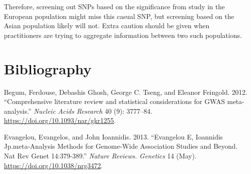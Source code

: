\documentclass[
]{article}
\begin{document}
Therefore, screening out SNPs based on the significance from study in
the European population might miss this casual SNP, but screening based
on the Asian population likely will not. Extra caution should be given
when practitioners are trying to aggregate information between two such
populations.

\hypertarget{bibliography}{%
\section{Bibliography}\label{bibliography}}

\setlength{\parindent}{-0.2in}
\setlength{\leftskip}{0.2in}
\setlength{\parskip}{8pt}

\noindent

\hypertarget{refs}{}
\leavevmode\hypertarget{ref-meta1}{}%
Begum, Ferdouse, Debashis Ghosh, George C. Tseng, and Eleanor Feingold.
2012. ``Comprehensive literature review and statistical considerations
for GWAS meta-analysis.'' \emph{Nucleic Acids Research} 40 (9):
3777--84. \url{https://doi.org/10.1093/nar/gkr1255}.

\leavevmode\hypertarget{ref-meta2}{}%
Evangelou, Evangelos, and John Ioannidis. 2013. ``Evangelou E, Ioannidis
Jp.meta-Analysis Methods for Genome-Wide Association Studies and Beyond.
Nat Rev Genet 14:379-389.'' \emph{Nature Reviews. Genetics} 14 (May).
\url{https://doi.org/10.1038/nrg3472}.
\end{document}
